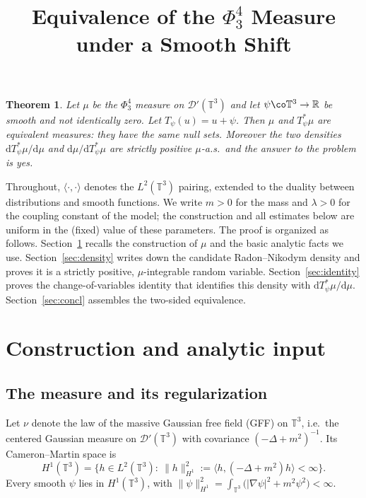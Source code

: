 \documentclass[12pt]{article}
\title{Equivalence of the $\Phi^4_3$ Measure under a Smooth Shift}
\author{}
\date{}
\newtheorem{theorem}{Theorem}
\theoremstyle{definition}
\newcommand{\T}{\mathbb{T}^3}
\newcommand{\R}{\mathbb{R}}
\newcommand{\dd}{\mathrm{d}}
\begin{document}
\maketitle

\begin{theorem}\label{thm:main}
Let $\mu$ be the $\Phi^4_3$ measure on $\mathcal D'(\T)$ and let $\psi\co\T\to\R$ be
smooth and not identically zero. Let $T_\psi(u)=u+\psi$. Then $\mu$ and $T_\psi^*\mu$
are equivalent measures: they have the same null sets. Moreover the two
densities $\dd T_\psi^*\mu/\dd\mu$ and $\dd\mu/\dd T_\psi^*\mu$ are
strictly positive $\mu$-a.s.\ and the answer to the problem is \emph{yes}.
\end{theorem}

Throughout, $\langle\cdot,\cdot\rangle$ denotes the $L^2(\T)$ pairing, extended to the
duality between distributions and smooth functions. We write $m>0$ for the mass and
$\lambda>0$ for the coupling constant of the model; the construction and all estimates
below are uniform in the (fixed) value of these parameters. The proof is organized as
follows. Section~\ref{sec:setup} recalls the construction of $\mu$ and the basic
analytic facts we use. Section~\ref{sec:density} writes down the candidate
Radon--Nikodym density and proves it is a strictly positive, $\mu$-integrable random
variable. Section~\ref{sec:identity} proves the change-of-variables identity that
identifies this density with $\dd T_\psi^*\mu/\dd\mu$. Section~\ref{sec:concl} assembles
the two-sided equivalence.

\section{Construction and analytic input}\label{sec:setup}

\subsection{The measure and its regularization}

Let $\nu$ denote the law of the massive Gaussian free field (GFF) on $\T$, i.e.\ the
centered Gaussian measure on $\mathcal D'(\T)$ with covariance $(-\Delta+m^2)^{-1}$.
Its Cameron--Martin space is
\begin{equation}\label{eq:CM}
  H^1(\T)=\Big\{h\in L^2(\T):\ \|h\|_{H^1}^2:=\langle h,(-\Delta+m^2)h\rangle<\infty\Big\}.
\end{equation}
Every smooth $\psi$ lies in $H^1(\T)$, with $\|\psi\|_{H^1}^2=\int_{\T}\big(|\nabla\psi|^2+m^2\psi^2\big)<\infty$.
\end{document}
